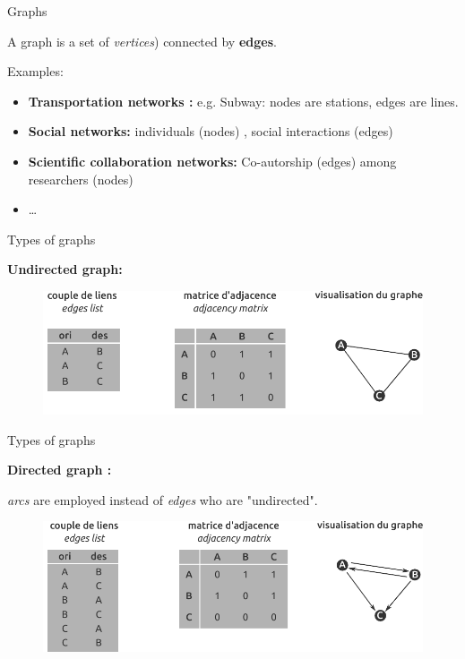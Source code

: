 \begin{frame}{Graphs}

A graph is a set of \textit{vertices}) connected by \textbf{edges}.



Examples:

\begin{itemize} 
  \item \textbf{Transportation networks  :} e.g. Subway: nodes are  stations,  edges are lines.
  \item \textbf{Social networks:} individuals (nodes) , social interactions (edges)
  \item \textbf{Scientific collaboration networks:} Co-autorship (edges) among researchers (nodes)
  \item \ldots
\end{itemize}

\end{frame}




\begin{frame}{Types of graphs}

\textbf{Undirected graph:}

\begin{figure}
  \includegraphics[width=12cm]{MatGraph3.pdf}
\end{figure}

\end{frame}


\begin{frame}{Types of graphs}

\textbf{Directed graph :}

\textit{arcs} are employed instead of \textit{edges} who are "undirected".

\begin{figure}
  \includegraphics[width=12cm]{MatGraph2.pdf}
\end{figure}

\end{frame}



